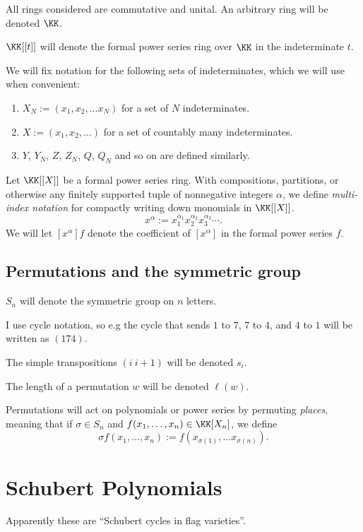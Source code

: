 \documentclass{article}
\begin{document}
All rings considered are commutative and unital. An arbitrary ring will be denoted $\KK$. 

$\KK[[t]]$ will denote the formal power series ring over $\KK$ in the indeterminate $t$.

We will fix notation for the following sets of indeterminates, which we will use when convenient:
\begin{enumerate}[label=(\alph*)]
    \item $X_N := (x_1, x_2, \ldots x_N)$ for a set of $N$ indeterminates.
    \item $X := (x_1, x_2, \ldots)$ for a set of countably many indeterminates.
    \item $Y$, $Y_N$, $Z$, $Z_N$, $Q$, $Q_N$ and so on are defined similarly.
\end{enumerate}

Let $\KK[[X]]$ be a formal power series ring. With compositions, partitions, or otherwise any finitely supported tuple of nonnegative integers $\alpha$, we define \textit{multi-index notation} for compactly writing down monomials in $\KK[[X]]$.
\[
    x^\alpha := x_1^{\alpha_1}x_2^{\alpha_2}x_3^{\alpha_3}\cdots.
\]
We will let $[x^\alpha]f$ denote the coefficient of $[x^\alpha]$ in the formal power series $f$.

\subsection{Permutations and the symmetric group}

$S_n$ will denote the symmetric group on $n$ letters.

I use cycle notation, so e.g the cycle that sends $1$ to $7$, $7$ to $4$, and $4$ to $1$ will be written as $(174)$.

The simple transpositions $(i\:i+1)$ will be denoted $s_i$.

The length of a permutation $w$ will be denoted $\ell(w)$.

Permutations will act on polynomials or power series by permuting \textit{places}, meaning that if $\sigma \in S_n$ and $f(x_1, \ldots, x_n) \in \KK[X_n]$, we define
\[
    \sigma f(x_1, \ldots, x_n) := f(x_{\sigma(1)}, \ldots x_{\sigma(n)}).
\]

\section{Schubert Polynomials}

Apparently these are ``Schubert cycles in flag varieties''.
\end{document}
